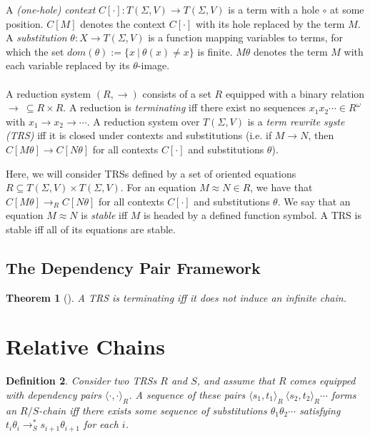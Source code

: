 \documentclass{article}
\newtheorem{theorem}{Theorem}[section]
\newtheorem{definition}[theorem]{Definition}
\newcommand{\dpair}[2]{\langle #1, #2 \rangle}
\begin{document}
A \emph{(one-hole) context} $C[\cdot] : T(\Sigma, V) \rightarrow T(\Sigma, V)$ is a term with a hole $\circ$ at some position. $C[M]$ denotes the context $C[\cdot]$ with its hole replaced by the term $M$. A \emph{substitution} $\theta : X \rightarrow T(\Sigma, V)$ is a function mapping variables to terms, for which the set $dom(\theta) := \{ x ~|~ \theta(x) \neq x\}$ is finite. $M \theta$ denotes the term $M$ with each variable replaced by its $\theta$-image. 
\\~\\
A reduction system $(R, \rightarrow)$ consists of a set $R$ equipped with a binary relation $\rightarrow ~\subseteq R \times R$. A reduction is \emph{terminating} iff there exist no sequences $x_1x_2 \cdots \in R^\omega$ with $x_1 \rightarrow x_2 \rightarrow \cdots$. A reduction system over $T(\Sigma, V)$ is a \emph{term rewrite syste (TRS)} iff it is closed under contexts and substitutions (i.e. if $M \rightarrow N$, then $C[M\theta] \rightarrow C[N\theta]$ for all contexts $C[\cdot]$ and substitutions $\theta$). 

Here, we will consider TRSs defined by a set of oriented equations $R \subseteq T(\Sigma, V) \times T(\Sigma, V)$. For an equation $M \approx N \in R$, we have that $C[M\theta] \rightarrow_R C[N\theta]$ for all contexts $C[\cdot]$ and substitutions $\theta$. We say that an equation $M \approx N$ is \emph{stable} iff $M$ is headed by a defined function symbol. A TRS is stable iff all of its equations are stable.  


\subsection{The Dependency Pair Framework}

\begin{theorem}[\cite{arts2000dependency}]\label{thm:no_infinite_chains}
    A TRS is terminating iff it does not induce an infinite chain.
\end{theorem} 

\section{Relative Chains}

\begin{definition}
    Consider two TRSs $R$ and $S$, and assume that $R$ comes equipped with dependency pairs $\dpair{\cdot}{\cdot}_R$. A sequence of these pairs $\dpair{s_1}{t_1}_R ~ \dpair{s_2}{t_2}_R \cdots$ forms an $R/S$-chain iff there exists some sequence of substitutions $\theta_1 \theta_2 \cdots$ satisfying $t_i \theta_i \rightarrow^*_S s_{i+1}\theta_{i+1}$ for each $i$. 
\end{definition}
\end{document}
